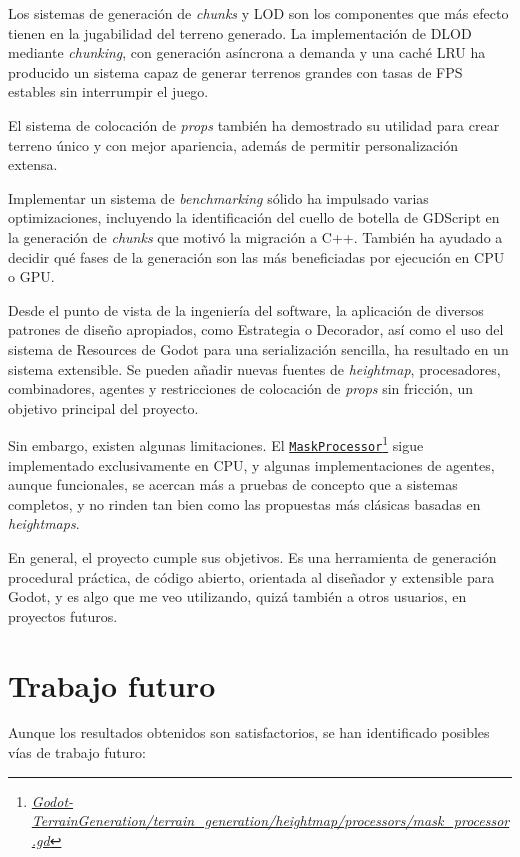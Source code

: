 Los sistemas de generación de \textit{chunks} y LOD son los componentes que más efecto tienen en la jugabilidad del terreno generado.
La implementación de DLOD mediante \textit{chunking}, con generación asíncrona a demanda y una caché LRU ha producido un sistema capaz de generar terrenos grandes con tasas de FPS estables sin interrumpir el juego.

El sistema de colocación de \textit{props} también ha demostrado su utilidad para crear terreno único y con mejor apariencia, además de permitir personalización extensa.

Implementar un sistema de \textit{benchmarking} sólido ha impulsado varias optimizaciones, incluyendo la identificación del cuello de botella de GDScript en la generación de \textit{chunks} que motivó la migración a C++.
También ha ayudado a decidir qué fases de la generación son las más beneficiadas por ejecución en CPU o GPU.

Desde el punto de vista de la ingeniería del software, la aplicación de diversos patrones de diseño apropiados, como Estrategia o Decorador, así como el uso del sistema de Resources de Godot para una serialización sencilla, ha resultado en un sistema extensible. Se pueden añadir nuevas fuentes de \textit{heightmap}, procesadores, combinadores, agentes y restricciones de colocación de \textit{props} sin fricción, un objetivo principal del proyecto.

Sin embargo, existen algunas limitaciones.
El \href{{https://github.com/fsande/TFG---Eric-Rios/blob/main/Godot-TerrainGeneration/terrain_generation/heightmap/processors/mask_processor.gd}}{\texttt{MaskProcessor}}\footnote{\href{{https://github.com/fsande/TFG---Eric-Rios/blob/main/Godot-TerrainGeneration/terrain_generation/heightmap/processors/mask_processor.gd}}{\textit{Godot-TerrainGeneration/terrain\_generation/heightmap/processors/mask\_processor.gd}}} sigue implementado exclusivamente en CPU, y algunas implementaciones de agentes, aunque funcionales, se acercan más a pruebas de concepto que a sistemas completos, y no rinden tan bien como las propuestas más clásicas basadas en \textit{heightmaps}.

En general, el proyecto cumple sus objetivos. 
Es una herramienta de generación procedural práctica, de código abierto, orientada al diseñador y extensible para Godot, y es algo que me veo utilizando, quizá también a otros usuarios, en proyectos futuros.

\section{Trabajo futuro}
Aunque los resultados obtenidos son satisfactorios, se han identificado posibles vías de trabajo futuro:

